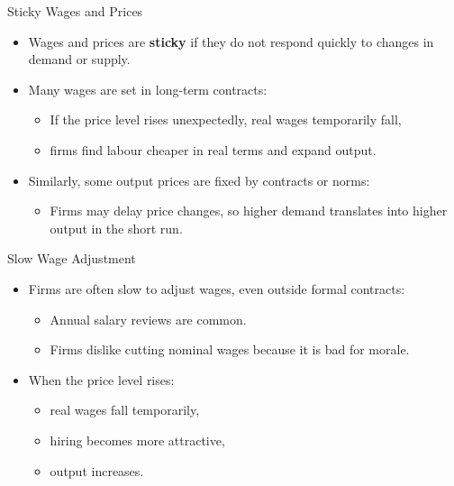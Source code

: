 \documentclass[aspectratio=169]{beamer}
\begin{document}
\begin{frame}{Sticky Wages and Prices}
\transfade
\begin{itemize}
  \item Wages and prices are \textbf{sticky} if they do not respond quickly to changes in demand or supply.
  \item Many wages are set in long-term contracts:
  \begin{itemize}
    \item If the price level rises unexpectedly, real wages temporarily fall,
    \item firms find labour cheaper in real terms and expand output.
  \end{itemize}
  \item Similarly, some output prices are fixed by contracts or norms:
  \begin{itemize}
    \item Firms may delay price changes, so higher demand translates into higher output in the short run.
  \end{itemize}
\end{itemize}
\end{frame}

\begin{frame}{Slow Wage Adjustment}
\transfade
\begin{itemize}
  \item Firms are often slow to adjust wages, even outside formal contracts:
  \begin{itemize}
    \item Annual salary reviews are common.
    \item Firms dislike cutting nominal wages because it is bad for morale.
  \end{itemize}
  \item When the price level rises:
  \begin{itemize}
    \item real wages fall temporarily,
    \item hiring becomes more attractive,
    \item output increases.
  \end{itemize}
\end{itemize}
\end{frame}
\end{document}
